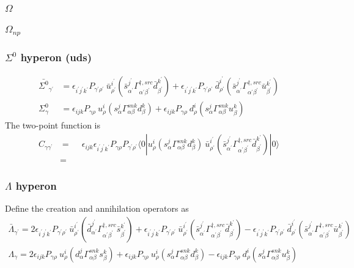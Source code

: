 \documentclass[prd,12pt,superscriptaddress,tightenlines,nofootinbib]{revtex4}
\def\a{{\alpha}}
\def\b{{\beta}}
\def\g{{\gamma}}
\def\G{{\Gamma}}
\def\ip{{i^\prime}}
\def\jp{{j^\prime}}
\def\kp{{k^\prime}}
\def\ap{{\alpha^\prime}}
\def\bp{{\beta^\prime}}
\def\gp{{\gamma^\prime}}
\def\rp{{\rho^\prime}}
\begin{document}
\subsubsection{$\Omega$}
\subsubsection{$\Omega_{np}$}



\subsubsection{$\Sigma^0$ hyperon (uds)}


\begin{align}
	\bar{\Sigma^0}_{\gp} &= \epsilon_{\ip\jp\kp} P_{\gp\rp}\ \bar{u}^\ip_\rp (\bar{s}^{\jp}_{\ap} \G^{\dagger,src}_{\ap\bp} \bar{d}^\kp_\bp ) 
	+ \epsilon_{\ip\jp\kp} P_{\gp\rp}\ \bar{d}^\ip_\rp (\bar{s}^{\jp}_{\ap} \G^{\dagger,src}_{\ap\bp} \bar{u}^\kp_\bp ) \\
	\Sigma^0_{\g} &= \epsilon_{ijk} P_{\g\rho}\ u^i_\rho (s^j_\a \G^{snk}_{\a\b} d^k_\b ) +  
	\epsilon_{ijk} P_{\g\rho}\ d^i_\rho (s^j_\a \G^{snk}_{\a\b} u^k_\b )
	\end{align}
The two-point function is 
\begin{align}
	C_{\g\gp} &= \phantom{-}\epsilon_{ijk} \epsilon_{\ip\jp\kp} P_{\g\rho} P_{\gp\rp} \langle 0| 
	u^i_\rho (s^j_\a \G^{snk}_{\a\b} d^k_\b ) \ \bar{u}^\ip_\rp (\bar{s}^{\jp}_{\ap} \G^{\dagger,src}_{\ap\bp} \bar{d}^\kp_\bp ) 
	|0\rangle
\nonumber\\ &=
\end{align}

\subsubsection*{$\Lambda$ hyperon}
Define the creation and annihilation operators as
\begin{gather}
	\bar{\Lambda}_{\gp} =  2\epsilon_{\ip\jp\kp} P_{\gp\rp}\ \bar{u}^\ip_\rp (\bar{d}^{\jp}_{\ap} \G^{\dagger,src}_{\ap\bp} \bar{s}^\kp_\bp ) 
	+ \epsilon_{\ip\jp\kp} P_{\gp\rp}\ \bar{u}^\ip_\rp (\bar{s}^{\jp}_{\ap} \G^{\dagger,src}_{\ap\bp} \bar{d}^\kp_\bp ) -
	\epsilon_{\ip\jp\kp} P_{\gp\rp}\ \bar{d}^\ip_\rp (\bar{s}^{\jp}_{\ap} \G^{\dagger,src}_{\ap\bp} \bar{u}^\kp_\bp ) 
	\\
	\Lambda_{\g} = 2\epsilon_{ijk} P_{\g\rho}\ u^i_\rho (d^j_\a \G^{snk}_{\a\b} s^k_\b ) +  \epsilon_{ijk} P_{\g\rho}\ u^i_\rho (s^j_\a \G^{snk}_{\a\b} d^k_\b ) - 
	\epsilon_{ijk} P_{\g\rho}\ d^i_\rho (s^j_\a \G^{snk}_{\a\b} u^k_\b ) 
\end{gather}
\end{document}
